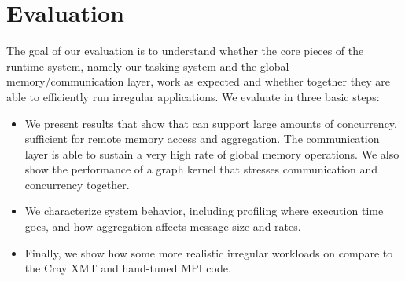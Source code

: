 \section{Evaluation}
\label{sec:evaluation}

The goal of our evaluation is to understand whether the core pieces of the \Grappa
runtime system, namely our tasking system and the global memory/communication
layer, work as expected and whether together they are able to efficiently run irregular
applications. We evaluate \Grappa in three basic steps:

\begin{itemize}

\item We present results that show that \Grappa can
    support large amounts of concurrency, sufficient for remote memory
    access and aggregation. The communication layer is able to
    sustain a very high rate of global memory operations. We also show the performance of a
graph kernel that stresses communication and concurrency together.

\item We characterize system behavior, including
profiling where execution time goes, and how aggregation affects message size and
rates.


\item Finally, we show how some more realistic irregular workloads on \Grappa
compare to the Cray XMT and hand-tuned MPI code.

%
\end{itemize}

